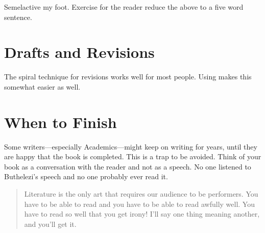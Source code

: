 Semelactive my foot. Exercise for the reader reduce the above to a five word sentence.

\chapter{Drafts and Revisions}

The spiral technique for revisions works well for most people. Using \latex makes this somewhat easier as well.
\lipsum[2]


\chapter{When to Finish}

Some writers---especially Academics---might keep on writing for years, until they are happy that the book is completed. This is a trap to be avoided. Think of your book as a conversation with the reader and not as a speech.
No one listened to Buthelezi’s speech and no one probably ever read it.

\begin{quotation}
Literature is the only art that requires our audience to be performers. You have to be able to read and you have to be able to read awfully well. You have to read so well that you get irony! I’ll say one thing meaning another, and you’ll get it.
\end{quotation}






